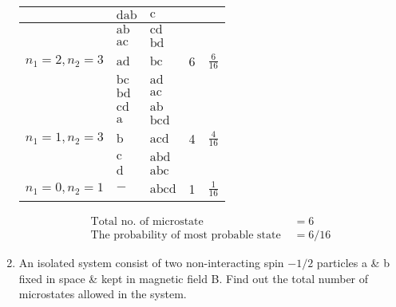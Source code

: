 \begin{enumerate}
\begin{center}
\begin{tabular}{|p{2.5cm}|p{2.7cm}|p{2.5cm}|p{2.7cm}|p{2.5cm}|}
		& $\mathrm{dab}$ & $\mathrm{c}$ & & \\
		\hline
		 &$\mathrm{ab}$&$\mathrm{cd}$ & &\\
		 &$\mathrm{ac}$&$\mathrm{bd}$ & &\\
		 $n_1=2,n_2=3$&$\mathrm{ad}$&$\mathrm{bc}$ &6&$\frac{6}{16}$\\
		 &$\mathrm{bc}$&$\mathrm{ad}$ & &\\
		 &$\mathrm{bd}$&$\mathrm{ac}$ & &\\
		 &$\mathrm{cd}$&$\mathrm{ab}$ & &\\
		 \hline
		  &$\mathrm{a}$&$\mathrm{bcd}$ & &\\
		$n_1=1,n_2=3$&$\mathrm{b}$&$\mathrm{acd}$ &4 &$\frac{4}{16}$\\
		  &$\mathrm{c}$&$\mathrm{abd}$ & &\\
		 &$\mathrm{d}$&$\mathrm{abc}$ & &\\
		  \hline
		  	$n_1=0,n_2=1$&$-$&$\mathrm{abcd}$ &1 &$\frac{1}{16}$\\
		  	 \hline
	\end{tabular}
\end{center}
\begin{answer}
	\begin{align*}
	\text{Total no. of microstate }&=6\\
	\text{The probability of most probable state }&=6/16
	\end{align*}
\end{answer}
	\item An isolated system consist of two non-interacting spin $-1/2$ particles a \& b fixed in space \& kept in magnetic field B. Find out the total number of microstates allowed in the system.


\end{enumerate}
